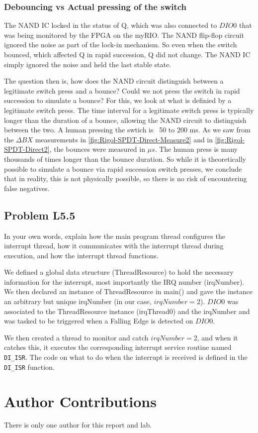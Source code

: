 \documentclass[10pt,twocolumn]{article}
\begin{document}
\subsubsection{Debouncing vs Actual pressing of the switch}
The NAND IC locked in the status of Q, which was also connected to $DIO0$ that was being monitored by the FPGA on the myRIO.
The NAND flip-flop circuit ignored the noise as part of the lock-in mechanism. So even when the switch bounced, which affected Q in rapid succession,
Q did not change. The NAND IC simply ignored the noise and held the last stable state.

The question then is, how does the NAND circuit distinguish between a legitimate switch press and a bounce? Could we not
press the switch in rapid succession to simulate a bounce? For this, we look at what is definied by a legitimate
switch press. The time interval for a legitimate switch press is typically longer than the duration of a bounce, 
allowing the NAND circuit to distinguish between the two. A human pressing the swtich is ~50 to 200 ms. As we saw from 
the $\Delta BX$ measurements in \autoref{fig:Rigol-SPDT-Direct-Measure2} and in \autoref{fig:Rigol-SPDT-Direct2}, the
bounces were measured in $\mu s$. The human press is many thousands of times longer than the bounce duration. So while it is
theoretically possible to simulate a bounce via rapid succession switch presses, we conclude that in reality, this is
not physically possible, so there is no risk of encountering false negatives.

\subsection{Problem L5.5}
In your own words, explain how the main program thread
configures the interrupt thread, how it communicates with the interrupt thread
during execution, and how the interrupt thread functions.

\vspace{\baselineskip}
We defined a global data structure (ThreadResource) to hold the necessary information for the interrupt, most importantly the IRQ number (irqNumber).
We then declared an instance of ThreadResource in main() and gave the instance an arbitrary but unique irqNumber (in our case, $irqNumber = 2$).
$DIO0$ was associated to the ThreadResource instance (irqThread0) and the irqNumber and was tasked to be triggered
when a Falling Edge is detected on $DIO0$.

We then created a thread to monitor and catch $irqNumber = 2$, and when it catches this, it executes the corresponding interrupt service routine named
\texttt{DI\_ISR}. The code on what to do when the interrupt is received is defined in the \texttt{DI\_ISR} function.

\section{Author Contributions}

There is only one author for this report and lab.







\end{document}
